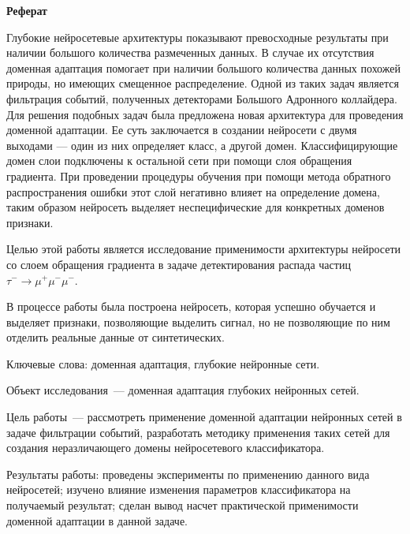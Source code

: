 \documentclass[14pt, a4paper]{extarticle}
\begin{document}
\centerline{\large \textbf{Реферат}}

\bigskip
\bigskip

Глубокие нейросетевые архитектуры показывают превосходные результаты при наличии большого количества размеченных данных. В случае их отсутствия доменная адаптация помогает при наличии большого количества данных похожей природы, но имеющих смещенное распределение.
Одной из таких задач является фильтрация событий, полученных детекторами Большого Адронного коллайдера.
Для решения подобных задач была предложена новая архитектура для проведения доменной адаптации.
Ее суть заключается в создании нейросети с двумя выходами — один из них определяет класс, а другой домен.
Классифицирующие домен слои подключены к остальной сети при помощи слоя обращения градиента.
При проведении процедуры обучения при помощи метода обратного распространения ошибки этот слой негативно влияет на определение домена, таким образом нейросеть выделяет неспецифические для конкретных доменов признаки.

Целью этой работы является исследование применимости архитектуры нейросети со слоем обращения градиента в задаче детектирования распада частиц $\tau^- \rightarrow \mu^+ \mu^- \mu^-$.

В процессе работы была построена нейросеть, которая успешно обучается и выделяет признаки, позволяющие выделить сигнал, но не позволяющие по ним отделить реальные данные от синтетических.

\medskip

\noindent
Ключевые слова: доменная адаптация, глубокие нейронные сети.

\medskip 

\noindent
Объект исследования~— доменная адаптация глубоких нейронных сетей.

\medskip 

\noindent
Цель работы~— рассмотреть применение доменной адаптации нейронных сетей в задаче фильтрации событий, разработать методику применения таких сетей для создания неразличающего домены нейросетевого классификатора.

\medskip 

\noindent
Результаты работы: проведены эксперименты по применению данного вида нейросетей; изучено влияние изменения параметров классификатора на получаемый результат; сделан вывод насчет практической применимости доменной адаптации в данной задаче.

\newpage
\end{document}
